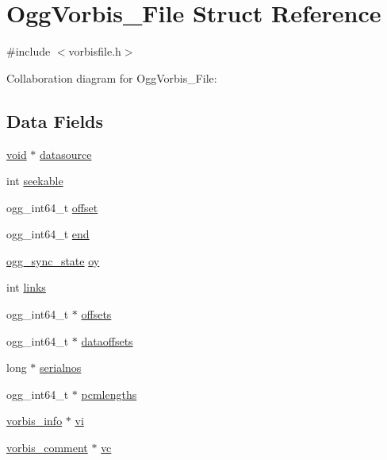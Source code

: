\hypertarget{struct_ogg_vorbis___file}{}\section{Ogg\+Vorbis\+\_\+\+File Struct Reference}
\label{struct_ogg_vorbis___file}


{\ttfamily \#include $<$vorbisfile.\+h$>$}



Collaboration diagram for Ogg\+Vorbis\+\_\+\+File\+:
\subsection*{Data Fields}
\begin{DoxyCompactItemize}
\item 
\hyperlink{png_8h_ac9c84fa68bbad002983e35ce3663c686}{void} $\ast$ \hyperlink{struct_ogg_vorbis___file_a46afb3dcc7aac5917573e41d7504c0d6}{datasource}
\item 
int \hyperlink{struct_ogg_vorbis___file_a2a390c4f15c0d1fe0cf9c90fd0bae087}{seekable}
\item 
ogg\+\_\+int64\+\_\+t \hyperlink{struct_ogg_vorbis___file_a36f8f9f012cd2e7ab8cb395b787376cb}{offset}
\item 
ogg\+\_\+int64\+\_\+t \hyperlink{struct_ogg_vorbis___file_ae56eb8bc78d2fc27c79d145a7c80a681}{end}
\item 
\hyperlink{structogg__sync__state}{ogg\+\_\+sync\+\_\+state} \hyperlink{struct_ogg_vorbis___file_ae35fa1e6f99edcb104566301324ecf94}{oy}
\item 
int \hyperlink{struct_ogg_vorbis___file_ad41f80ffaa6b48a14addef0a02639a87}{links}
\item 
ogg\+\_\+int64\+\_\+t $\ast$ \hyperlink{struct_ogg_vorbis___file_af9fe0ece4ff98e207682731b36951920}{offsets}
\item 
ogg\+\_\+int64\+\_\+t $\ast$ \hyperlink{struct_ogg_vorbis___file_af797824fb6e98c0248c19e6909dd680e}{dataoffsets}
\item 
long $\ast$ \hyperlink{struct_ogg_vorbis___file_abd5a9adc78abd620ce2c63bd153df150}{serialnos}
\item 
ogg\+\_\+int64\+\_\+t $\ast$ \hyperlink{struct_ogg_vorbis___file_a88a4e6a4ec6c9837d44e6cc0c864679e}{pcmlengths}
\item 
\hyperlink{structvorbis__info}{vorbis\+\_\+info} $\ast$ \hyperlink{struct_ogg_vorbis___file_aa5586b939d7c31c8eec83cf1380b45a6}{vi}
\item 
\hyperlink{structvorbis__comment}{vorbis\+\_\+comment} $\ast$ \hyperlink{struct_ogg_vorbis___file_a4467850c72aed93fe0a70e8f1fd6f20e}{vc}

\end{DoxyCompactItemize}
